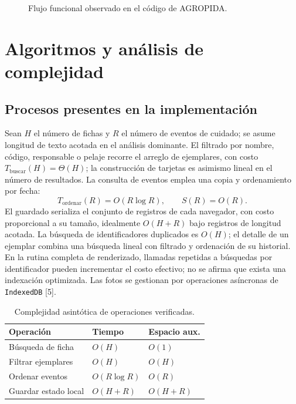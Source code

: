 \documentclass[conference,10pt]{IEEEtran}
\begin{document}
\begin{figure}[!t]
\centering
{}
\caption{Flujo funcional observado en el código de AGROPIDA.}
\label{fig:flujo}
\end{figure}

\section{Algoritmos y análisis de complejidad}
\subsection{Procesos presentes en la implementación}
Sean $H$ el número de fichas y $R$ el número de eventos de cuidado; se asume longitud de texto acotada en el análisis dominante. El filtrado por nombre, código, responsable o pelaje recorre el arreglo de ejemplares, con costo $T_{\mathrm{buscar}}(H)=\Theta(H)$; la construcción de tarjetas es asimismo lineal en el número de resultados. La consulta de eventos emplea una copia y ordenamiento por fecha:
\begin{equation}
T_{\mathrm{ordenar}}(R)=O(R\log R),\qquad S(R)=O(R).
\label{eq:sort}
\end{equation}
El guardado serializa el conjunto de registros de cada navegador, con costo proporcional a su tamaño, idealmente $O(H+R)$ bajo registros de longitud acotada. La búsqueda de identificadores duplicados es $O(H)$; el detalle de un ejemplar combina una búsqueda lineal con filtrado y ordenación de su historial. En la rutina completa de renderizado, llamadas repetidas a búsquedas por identificador pueden incrementar el costo efectivo; no se afirma que exista una indexación optimizada. Las fotos se gestionan por operaciones asíncronas de \texttt{IndexedDB} [5].

\begin{table}[!t]
\caption{Complejidad asintótica de operaciones verificadas.}
\label{tab:comp}
\centering\footnotesize
\begin{tabularx}{\columnwidth}{@{}Yll@{}}\toprule
\textbf{Operación}&\textbf{Tiempo}&\textbf{Espacio aux.}\tabularnewline\midrule
Búsqueda de ficha&$O(H)$&$O(1)$\tabularnewline
Filtrar ejemplares&$O(H)$&$O(H)$\tabularnewline
Ordenar eventos&$O(R\log R)$&$O(R)$\tabularnewline
Guardar estado local&$O(H+R)$&$O(H+R)$\tabularnewline\bottomrule
\end{tabularx}
\end{table}
\end{document}

